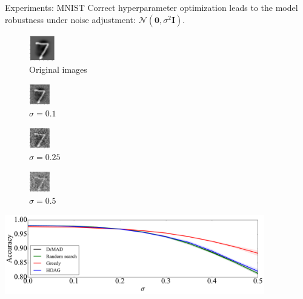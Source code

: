 \documentclass[usenames,dvipsnames,11pt,pdf,utf8,russian,aspectratio=169]{beamer}
\begin{document}
\begin{frame}{Experiments: MNIST}
Correct hyperparameter optimization leads to the model robustness under noise adjustment:  $\mathcal{N}(\mathbf{0},\sigma^2\mathbf{I})$.

\setlength{\columnsep}{10pt}
\begin{multicols}{4}
\begin{figure}[h]
\includegraphics[width=0.10\textwidth]{./mnist0.png}
\caption*{Original images}
\end{figure}

\begin{figure}[h]
\includegraphics[width=0.08\textwidth]{./mnist10.png}
\caption*{$\sigma=0.1$}
\end{figure}

\begin{figure}[h]
\includegraphics[width=0.08\textwidth]{./mnist25.png}
\caption*{$\sigma=0.25$}
\end{figure}

\begin{figure}[h]
\includegraphics[width=0.08\textwidth]{./mnist50.png}
\caption*{$\sigma=0.5$}
\end{figure}
\end{multicols}
\begin{center}
\includegraphics[width=0.85\textwidth]{Fig_noise.pdf}
\end{center}
\end{frame}
\end{document}
